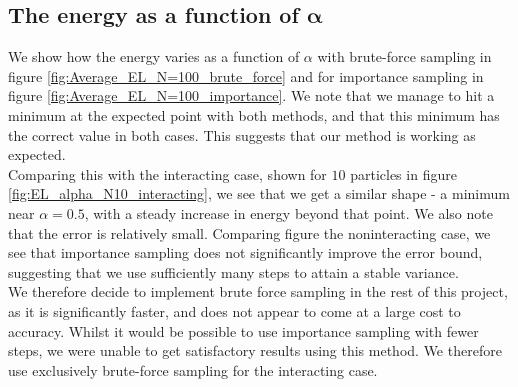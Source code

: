 \documentclass[a4paper, 10pt]{article}
\begin{document}
	\subsection{The energy as a function of $\boldsymbol{\alpha}$}\label{sec:Disc_energy_as_a_function_of_alpha}
	We show how the energy varies as a function of $\alpha$ with brute-force sampling in figure \ref{fig:Average_EL_N=100_brute_force} and for importance sampling in figure \ref{fig:Average_EL_N=100_importance}. We note that we manage to hit a minimum at the expected point with both methods, and that this minimum has the correct value in both cases. This suggests that our method is working as expected.\\
	\linebreak
	 Comparing this with the interacting case, shown for $10$ particles in figure \ref{fig:EL_alpha_N10_interacting}, we see that we get a similar shape - a minimum near $\alpha=0.5$, with a steady increase in energy beyond that point. We also note that the error is relatively small. Comparing figure the noninteracting case, we see that importance sampling does not significantly improve the error bound, suggesting that we use sufficiently many steps to attain a stable variance.\\
	 \linebreak
	 We therefore decide to implement brute force sampling in the rest of this project, as it is significantly faster, and does not appear to come at a large cost to accuracy. Whilst it would be possible to use importance sampling with fewer steps, we were unable to get satisfactory results using this method. We therefore use exclusively brute-force sampling for the interacting case.
\end{document}
